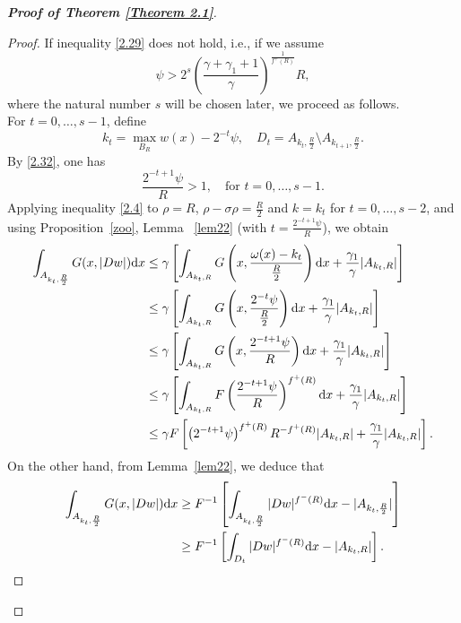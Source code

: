 \documentclass[10pt,reqno]{amsart}
\newcommand *\w{^\wedge}
\theoremstyle{definition}
\numberwithin{equation}{section}
\begin{document}
\begin{proof}[\textbf{Proof of Theorem \ref{Theorem 2.1}}]
\begin{proof}
If inequality \eqref{2.29} does not hold, i.e., if we assume
\begin{equation}\label{2.32}
\psi > 2^s \left( \frac{\gamma + \gamma_1 + 1}{\gamma} \right)^{\frac{1}{f^+(R)}} R,
\end{equation}
where the natural number \( s \) will be chosen later, we proceed as follows.\\
For \( t = 0, \ldots, s - 1 \), define
\[
k_t = \max_{B_R} w(x) - 2^{-t} \psi, \quad D_t = A_{k_t, \frac{R}{2}} \setminus A_{k_{t+1}, \frac{R}{2}}.
\]
By \eqref{2.32}, one has  
\begin{equation}\label{2.32m}
\frac{ 2^{-t+1}\psi}{R}> 1,\quad \text{for } t = 0, \ldots, s - 1.
\end{equation}
Applying inequality \eqref{2.4} to \(\rho = R\), \(\rho - \sigma \rho = \frac{R}{2}\) and \(k = k_t\) for \(t = 0, \ldots, s - 2\), and using Proposition~\ref{zoo}, Lemma ~\ref{lem22} (with $t= \frac{2^{-t+1}\psi}{R} $), we  obtain
\begin{align}\label{Ge1}
\begin{split}
\int_{A_{k_t, \frac{R}{2}}} G(x,|Dw|){\rm d}x &\leq \gamma\left[\int_{A_{k_t, R}}G\left(x,\frac{\omega(x)-k_t}{\frac{R}{2}}\right){\rm d}x +\frac{\gamma_1}{\gamma} |A_{k_t, R}|\right]\\
& \leq\gamma\left[\int_{A_{k_t, R}}G\left(x,\frac{2^{-t}\psi}{\frac{R}{2}}\right){\rm d}x +\frac{\gamma_1}{\gamma} |A_{k_t, R}|\right]\\
&\leq \gamma\left[\int_{A_{k_t, R}}G\left(x,\frac{2^{-t+1}\psi}{R}\right){\rm d}x+\frac{\gamma_1}{\gamma} |A_{k_t, R}|\right]\\
& \leq \gamma \left[\int_{A_{k_t, R}}F \left(\frac{2^{-t+1}\psi}{R}\right)^{f^+(R)}{\rm d}x+\frac{\gamma_1}{\gamma} |A_{k_t, R}|\right]\\
& \leq \gamma F\left[\left(2^{-t+1}\psi\right)^{f^+(R)}R^{-f^+(R)}|A_{k_t, R}|+\frac{\gamma_1}{\gamma} |A_{k_t, R}|\right].
\end{split}
\end{align}
On the other hand, from Lemma~\ref{lem22}, we deduce that
\begin{align}\label{Ge2}
\begin{split}
    \int_{A_{k_t, \frac{R}{2}}} G(x,|Dw|){\rm d}x &\geq F^{-1}\left[\int_{A_{k_t, \frac{R}{2}}} |Dw|^{f^-(R)}{\rm d}x - |A_{k_t, \frac{R}{2}}|\right] \\
    &\geq F^{-1}\left[\int_{D_{t}} |Dw|^{f^-(R)}{\rm d}x - |A_{k_t, R}|\right].
   \end{split}

\end{align}
\end{proof}
\end{proof}
\end{document}
